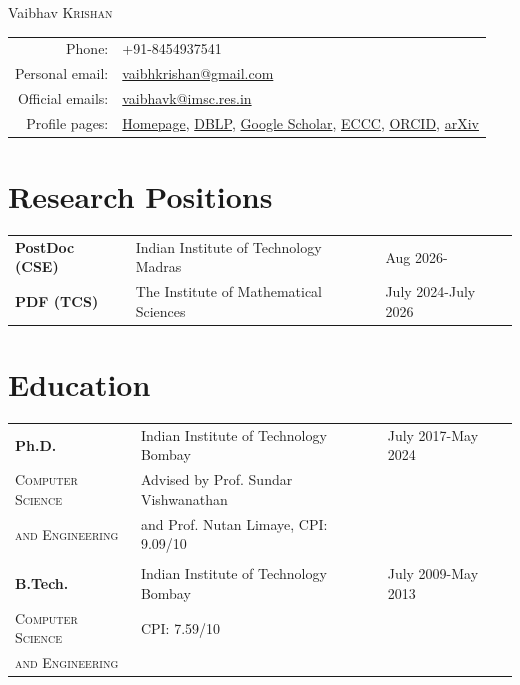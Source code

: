 \documentclass[a4paper,10pt]{article}
\begin{document}
\par{\centering
{\Huge Vaibhav \textsc{Krishan}
}\bigskip\par}

\begin{tabular}{rl}
  Phone: & +91-8454937541 \\
  Personal email: & \href{mailto:vaibhkrishan@gmail.com}{vaibhkrishan@gmail.com} \\ 
  Official emails: & \href{mailto:vaibhavk@imsc.res.in}{vaibhavk@imsc.res.in}\\
  Profile pages: & \href{https://vaibhkrishan.github.io}{Homepage}, 
  \href{https://dblp.org/pid/187/8296.html}{DBLP},
  \href{https://scholar.google.com/citations?user=dVMC44EAAAAJ&hl=en}{Google Scholar},
  \href{https://eccc.weizmann.ac.il/author/985/}{ECCC},
  \href{https://orcid.org/0009-0000-0335-1963}{ORCID},
  \href{http://arxiv.org/a/krishan_v_1}{arXiv}
\end{tabular}

\section{Research Positions}

\begin{tabular}{p{3.5cm}ll}
  {\bf PostDoc (CSE)} & Indian Institute of Technology Madras & Aug 2026-\\
  {\bf PDF (TCS)} & The Institute of Mathematical Sciences & July 2024-July 2026
\end{tabular}

\section{Education}

\begin{tabular}{p{3.5cm}ll}
  {\bf Ph.D.} & Indian Institute of Technology Bombay & July 2017-May 2024 \\
  \textsc{Computer Science} & Advised by Prof. Sundar Vishwanathan & \\
  \textsc{and Engineering} & and Prof. Nutan Limaye, CPI: 9.09/10 & \\
  \\
  {\bf B.Tech.} & Indian Institute of Technology Bombay & July 2009-May 2013 \\
  \textsc{Computer Science} & CPI: 7.59/10 & \\
  \textsc{and Engineering} & & \\
\end{tabular}
\end{document}

